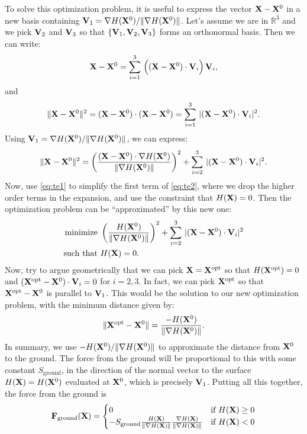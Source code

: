 \documentclass[10pt]{article}
\begin{document}
To solve this optimization problem, it is useful to express the vector ${\bf X} - {\bf X}^0$ in a new basis containing ${\bf V}_1 = \nabla H({\bf X}^0) / \|  \nabla H({\bf X}^0) \|$.  Let's assume we are in $\mathbb{R}^3$ and we pick ${\bf V}_2$ and ${\bf V}_3$ so that $\{ {\bf V}_1,  {\bf V}_2,  {\bf V}_3 \}$ forms an orthonormal basis.  Then we can write:
\begin{align*}
{\bf X} - {\bf X}^0 = \sum_{i=1}^3 \, \Big(({\bf X} - {\bf X}^0) \cdot {\bf V}_i \Big) \, {\bf V}_i, 
\end{align*} 
and
\textbf{\begin{align*}
\|{\bf X} - {\bf X}^0\|^2 = ({\bf X} - {\bf X}^0) \cdot ({\bf X} - {\bf X}^0) = \sum_{i=1}^3 \, |({\bf X} - {\bf X}^0) \cdot {\bf V}_i|^2. 
\end{align*} }
Using ${\bf V}_1 = \nabla H({\bf X}^0) / \|  \nabla H({\bf X}^0) \|$, we can express:
\begin{align}
\label{eq:te2}
\|{\bf X} - {\bf X}^0\|^2 = \left(\frac{({\bf X} - {\bf X}^0) \cdot \nabla H({\bf X}^0)}{\|  \nabla H({\bf X}^0) \|} \right)^2 +  \sum_{i=2}^3 \, |({\bf X} - {\bf X}^0) \cdot {\bf V}_i|^2. 
\end{align} 
Now, use \eqref{eq:te1} to simplify the first term of \eqref{eq:te2}, where we drop the higher order terms in the expansion, and use the constraint that $H({\bf X}) = 0$.  Then the optimization problem can be ``approximated'' by this new one:
\begin{align*}
\text{minimize }&\left(\frac{H({\bf X}^0)}{\|  \nabla H({\bf X}^0) \|}\right)^2 +  \sum_{i=2}^3 \, |({\bf X} - {\bf X}^0) \cdot {\bf V}_i|^2 \\
\text{such that }&H({\bf X}) = 0.
\end{align*} 
Now, try to argue geometrically that we can pick ${\bf X} = {\bf X}^\text{opt}$ so that $H({\bf X}^\text{opt}) = 0$ and $({\bf X}^\text{opt} - {\bf X}^0) \cdot {\bf V}_i = 0$ for $i = 2, 3$.  In fact, we can pick ${\bf X}^\text{opt}$ so that ${\bf X}^\text{opt} - {\bf X}^0$ is parallel to ${\bf V}_1$.  This would be the solution to our new optimization problem, with the minimum distance given by:
\begin{align*}
\| {\bf X}^\text{opt} - {\bf X}^0 \| = \frac{-H({\bf X}^0)}{\|  \nabla H({\bf X}^0) \|}.
\end{align*} 
In summary, we use $-H({\bf X}^0) /\|  \nabla H({\bf X}^0)\|$ to approximate the distance from ${\bf X}^0$ to the ground.  The force from the ground will be proportional to this with some constant $S_\text{ground}$, in the direction of the normal vector to the surface $H({\bf X}) = H({\bf X}^0)$ evaluated at ${\bf X}^0$, which is precisely ${\bf V}_1$.  Putting all this together, the force from the ground is
\begin{align*}
{\bf F}_\text{ground}({\bf X}) = 
\begin{cases}
0 & \text{if }H({\bf X}) \geq 0 \\
-S_\text{ground} \frac{H({\bf X})}{\|\nabla H({\bf X})\|} \frac{\nabla H({\bf X})}{\|\nabla H({\bf X})\|} & \text{if }H({\bf X}) < 0
\end{cases}
\end{align*}
\end{document}

